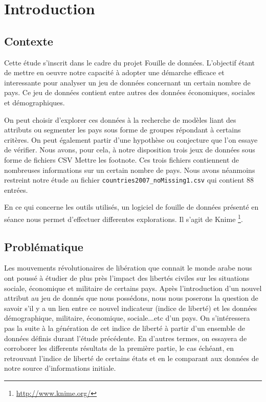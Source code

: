 \section{Introduction}

\subsection{Contexte}
Cette étude s'inscrit dans le cadre du projet Fouille de données. L'objectif étant de mettre en oeuvre notre capacité à adopter une démarche efficace et interessante pour analyser un jeu de données concernant un certain nombre de pays.
Ce jeu de données contient entre autres des données économiques, sociales et démographiques. 

On peut choisir d'explorer ces données à la recherche de modèles liant des attributs ou segmenter les pays sous forme de groupes répondant à certains critères. On peut également partir d'une hypothèse ou conjecture que l'on essaye de vérifier.  
Nous avons, pour cela, à notre disposition trois jeux de données sous forme de fichiers CSV \huge{Mettre les footnote}. Ces trois fichiers contiennent de nombreuses informations sur un certain nombre de pays. Nous avons néanmoins restreint notre étude au fichier \verb!countries2007_noMissing1.csv! qui contient 88 entrées.

En ce qui concerne les outils utilisés, un logiciel de fouille de données présenté en séance nous permet d'effectuer differentes explorations. Il s'agit de Knime \footnote{\url{http://www.knime.org/}}. 

\subsection{Problématique}

Les mouvements révolutionaires de libération que connait le monde arabe nous ont poussé à étudier de plus près l'impact des libertés civiles sur les situations sociale, économique et militaire de certains pays.
Après l'introduction d'un nouvel attribut au jeu de donnés que nous possédons, nous nous poserons la question de savoir s'il y a un lien entre ce nouvel indicateur (indice de liberté) et les données démographique, militaire, économique, sociale...etc d'un pays.
On s'intéressera pas la suite à la génération de cet indice de liberté à partir d'un ensemble de données définis durant l'étude précédente. En d'autres termes, on essayera de corroborer les differents résultats de la première partie, le cas échéant, en retrouvant l'indice de liberté de certains états et en le comparant aux données de notre source d'informations initiale.


